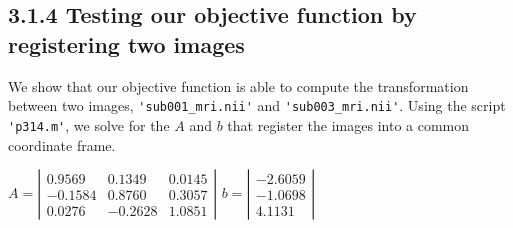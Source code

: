 \documentclass{article}
\begin{document}
\begin{par}
%			
		
		\subsection*{3.1.4 Testing our objective function by registering two images}
		We show that our objective function is able to compute the transformation between two images, \lstinline|'sub001_mri.nii'| and \lstinline|'sub003_mri.nii'|. Using the script \lstinline|'p314.m'|, we solve for the $A$ and $b$ that register the images into a common coordinate frame. \\
		
		\begin{center}
		$ A = \left| \begin{array}{ccc}
				 0.9569 & 0.1349 & 0.0145 \\
				 -0.1584 & 0.8760 & 0.3057 \\ 
				 0.0276 & -0.2628 & 1.0851 \end{array} \right| $
		$ b = \left| \begin{array}{c}
			-2.6059 \\
			-1.0698 \\
			4.1131 \end{array} \right| $		
		\end{center}


\end{par}
\end{document}
